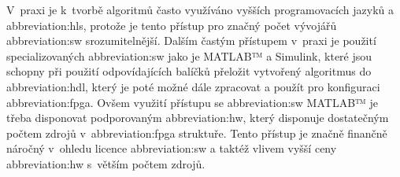 \documentclass[a4paper, twoside, 11pt]{article}
\begin{document}
		V~praxi je k~tvorbě algoritmů často využíváno vyšších programovacích jazyků a \gls{abbreviation:hls}, protože je tento přístup pro značný počet vývojářů \gls{abbreviation:sw} srozumitelnější. Dalším častým přístupem v~praxi je použití specializovaných \gls{abbreviation:sw} jako je MATLAB™️ a Simulink, které jsou schopny při použití odpovídajících balíčků přeložit vytvořený algoritmus do \gls{abbreviation:hdl}, který je poté možné dále zpracovat a použít pro konfiguraci \gls{abbreviation:fpga}. Ovšem využití přístupu se \gls{abbreviation:sw} MATLAB™️ je třeba disponovat podporovaným \gls{abbreviation:hw}, který disponuje dostatečným počtem zdrojů v~\gls{abbreviation:fpga} struktuře. Tento přístup je značně finančně náročný v~ohledu licence \gls{abbreviation:sw} a taktéž vlivem vyšší ceny \gls{abbreviation:hw} s~větším počtem zdrojů.
\end{document}

